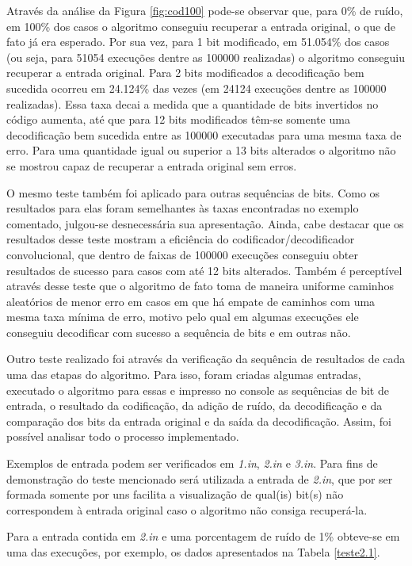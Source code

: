 \documentclass[12pt]{article}
\begin{document}
Através da análise da Figura \ref{fig:cod100} pode-se observar que, para 0\% de ruído, em 100\% dos casos o algoritmo conseguiu recuperar a entrada original, o que de fato já era esperado. Por sua vez, para 1 bit modificado, em 51.054\% dos casos (ou seja, para 51054 execuções dentre as 100000 realizadas) o algoritmo conseguiu recuperar a entrada original. Para 2 bits modificados a decodificação bem sucedida ocorreu em 24.124\% das vezes (em 24124  execuções dentre as 100000 realizadas). Essa taxa decai a medida que a quantidade de bits invertidos no código aumenta, até que para 12 bits modificados têm-se somente uma decodificação bem sucedida entre as 100000 executadas para uma mesma taxa de erro. Para uma quantidade igual ou superior a 13 bits alterados o algoritmo não se mostrou capaz de recuperar a entrada original sem erros.

O mesmo teste também foi aplicado para outras sequências de bits. Como os resultados para elas foram semelhantes às taxas encontradas no exemplo comentado, julgou-se desnecessária sua apresentação. Ainda, cabe destacar que os resultados desse teste mostram a eficiência do codificador/decodificador convolucional, que dentro de faixas de 100000 execuções conseguiu obter resultados de sucesso para casos com até 12 bits alterados. Também é perceptível através desse teste que o algoritmo de fato toma de maneira uniforme caminhos aleatórios de menor erro em casos em que há empate de caminhos com uma mesma taxa mínima de erro, motivo pelo qual em algumas execuções ele conseguiu decodificar com sucesso a sequência de bits e em outras não.

Outro teste realizado foi através da verificação da sequência de resultados de cada uma das etapas do algoritmo. Para isso, foram criadas algumas entradas, executado o algoritmo para essas e impresso no console as sequências de bit de entrada, o resultado da codificação, da adição de ruído, da decodificação e da comparação dos bits da entrada original e da saída da decodificação. Assim, foi possível analisar todo o processo implementado.

Exemplos de entrada podem ser verificados em \emph{1.in}, \emph{2.in} e \emph{3.in}. Para fins de demonstração do teste mencionado será utilizada a entrada de \emph{2.in}, que por ser formada somente por uns facilita a visualização de qual(is) bit(s) não correspondem à entrada original caso o algoritmo não consiga recuperá-la.

Para a entrada contida em \emph{2.in} e uma porcentagem de ruído de 1\% obteve-se em uma das execuções, por exemplo, os dados apresentados na Tabela \ref{teste2.1}.
\end{document}
